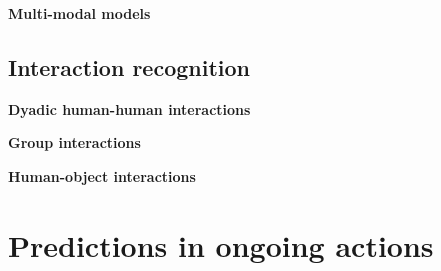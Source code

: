 \documentclass[smallextended,twocolumn,natbib]{svjour3}
\begin{document}
\noindent
\textbf{Multi-modal models}
\citep{akbari2021vatt}
\citep{kaiser2017one}
\citep{radevski2023multimodal} 
\citep{srivastava2024omnivec}
\citep{zhang2024multimodal}
\citep{munro2020multi}
\citep{recasens2023zorro}
\citep{dai2022one}
\citep{zellers2022merlot}
\citep{srivastava2024omnivec2}


\subsection{Interaction recognition}

\noindent
\textbf{Dyadic human-human interactions}

\citep{nguyen2024hig}
\citep{ong2023chaotic}

\noindent
\textbf{Group interactions}

\noindent
\textbf{Human-object interactions}


\section{Predictions in ongoing actions}
\label{sec:prediction}

\citep{huang2018makes}
\end{document}
